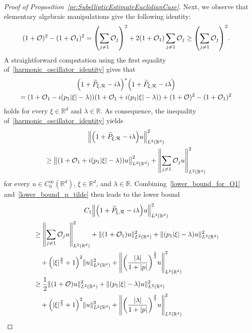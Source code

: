 \documentclass[AHL,Unicode,longabstracts]{cedram}
\newcommand{\R}{\mathbb{R}}
\newcommand{\clO}{\mathcal{O}}
\newcommand{\clR}{\mathcal{R}}
\newcommand{\abs}[1]{\left| #1 \right|}
\newcommand\norm[1]{\left\lVert#1\right\rVert}
\let\originalleft\left
\let\originalright\right
\renewcommand{\left}{\mathopen{}\mathclose\bgroup\originalleft}
\renewcommand{\right}{\aftergroup\egroup\originalright}
\begin{document}
\begin{proof}[{Proof of Proposition~\ref{pr:SubellipticEstimateEuclidianCase}}]
Next, we observe that elementary algebraic manipulations give the following identity:
\begin{equation}\label{harmonic_oscillator_identity}
(1+\clO)^2-(1+\clO_1)^2 = \left(\sum_{j \neq 1} \clO_j \right)^2 + 2(1+\clO_1) \sum_{j \neq 1} \clO_j\geq \left(\sum_{j \neq 1} \clO_j \right)^2.
\end{equation}
A straightforward computation using the first equality of~\eqref{harmonic_oscillator_identity} gives that
\begin{multline}\label{positive_operator_identity}
\left(1+\widetilde{P}_{\xi, \clR}-i\lambda\right)^*\left(1+\widetilde{P}_{\xi, \clR}-i\lambda\right) \\= (1+\clO_1-i(p_1 \abs{\xi}-\lambda))(1+\clO_1+i(p_1 \abs{\xi}-\lambda))
+(1+\clO)^2-(1+\clO_1)^2
\end{multline}
holds for every $\xi \in \R^d$ and $\lambda \in \R$. As consequence, the inequality of~\eqref{harmonic_oscillator_identity} yields
\begin{multline}\label{lower_bound_p_tilde}
\norm{\left(1+\widetilde{P}_{\xi, \clR}-i\lambda\right)u}^2_{L^2(\R^d)}\\
\geq \bigl\|(1+\clO_1+i(p_1 \abs{\xi}-\lambda))u\bigr\|^2_{L^2(\R^d)} + \norm{\sum_{j\neq 1}\clO_j u}^{2}_{L^2(\R^d)}
\end{multline}
for every $u \in C^\infty_0(\R^d)$, $\xi \in \R^d$, and $\lambda \in \R$. Combining~\eqref{lower_bound_for_O1} and~\eqref{lower_bound_p_tilde} then leads to the lower bound
\begin{multline}\label{estimate_for_P_xi_R}
C_1\left\| \left(1+\widetilde{P}_{\xi,\clR}-i\lambda\right)u\right\|^{2}_{L^2(\R^d)}
\\
\begin{aligned}
&\geq \left\| \sum_{j\neq 1}\clO_j u\right\|^{2}_{L^2(\R^d)} +\|(1+\clO_{1})u\|^2_{L^2(\R^d)} +\| (p_{1}|\xi|-\lambda)u\|^{2}_{L^2(\R^d)}
\\
&\quad+ \left(|\xi|^{\frac{2}{3}}+1\right)^{2}\|u\|^{2}_{L^2(\R^d)} +
\left\|
\left(
\frac{|\lambda|}{1+|p|}
\right)^{\frac{2}{3}} u
\right\|^{2}_{L^2(\R^{d})}
\\
&\geq \frac{1}{2}\| (1+\clO) u\|^{2}_{L^2(\R^d)} +\| (p_{1}|\xi|-\lambda)u\|^{2}_{L^2(\R^d)}
\\
&\quad+ \left(|\xi|^{\frac{2}{3}}+1\right)^{2}\|u\|^{2}_{L^2(\R^d)} +
\left\|
\left(
\frac{|\lambda|}{1+|p|}
\right)^{\frac{2}{3}} u
\right\|^{2}_{L^2(\R^{d})}
\end{aligned}
\end{multline}

\end{proof}
\end{document}
